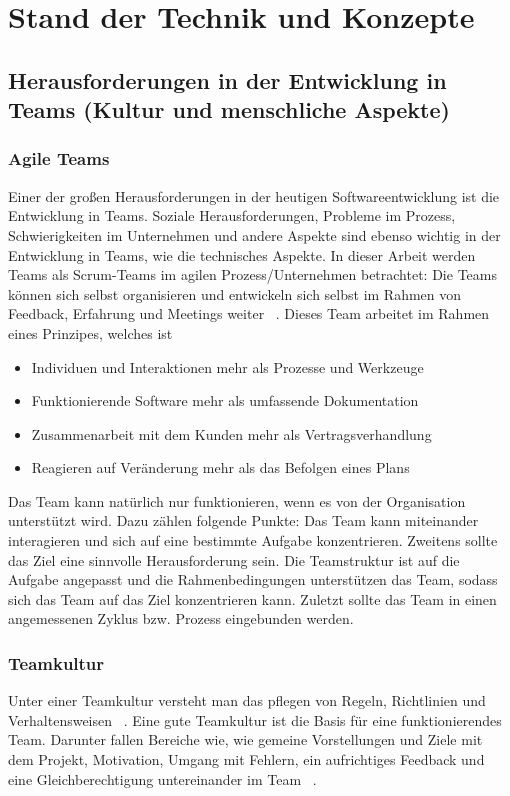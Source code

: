 \chapter{Stand der Technik und Konzepte}
\chapterstart

\label{chap:related}
\section{Herausforderungen in der Entwicklung in Teams (Kultur und menschliche Aspekte)}
\subsection{Agile Teams}
Einer der großen Herausforderungen in der heutigen Softwareentwicklung ist die Entwicklung in Teams. Soziale Herausforderungen, Probleme im Prozess, Schwierigkeiten im Unternehmen und andere Aspekte sind ebenso wichtig in der Entwicklung in Teams, wie die technisches Aspekte. In dieser Arbeit werden Teams als Scrum-Teams im agilen Prozess/Unternehmen betrachtet: Die Teams können sich selbst organisieren und entwickeln sich selbst im Rahmen von Feedback, Erfahrung und Meetings weiter ~\parencite{cohn2003introducing}. Dieses Team arbeitet im Rahmen eines Prinzipes, welches ist ~\parencite{beck2001agile}
\begin{itemize} 
\item Individuen und Interaktionen mehr als Prozesse und Werkzeuge
\item Funktionierende Software mehr als umfassende Dokumentation
\item Zusammenarbeit mit dem Kunden mehr als Vertragsverhandlung
\item Reagieren auf Veränderung mehr als das Befolgen eines Plans
\end{itemize}
Das Team kann natürlich nur funktionieren, wenn es von der Organisation unterstützt wird. Dazu zählen folgende Punkte: Das Team kann miteinander interagieren und sich auf eine bestimmte Aufgabe konzentrieren. Zweitens sollte das Ziel eine sinnvolle Herausforderung sein. Die Teamstruktur ist auf die Aufgabe angepasst und die Rahmenbedingungen unterstützen das Team, sodass sich das Team auf das Ziel konzentrieren kann. Zuletzt sollte das Team in einen angemessenen Zyklus bzw. Prozess eingebunden werden. ~\parencite{boos2017fuhrung}
\subsection{Teamkultur}
Unter einer Teamkultur versteht man das pflegen von Regeln, Richtlinien und Verhaltensweisen ~\parencite{teamculture}. Eine gute Teamkultur ist die Basis für eine funktionierendes Team. Darunter fallen Bereiche wie, wie gemeine Vorstellungen und Ziele mit dem Projekt, Motivation, Umgang mit Fehlern, ein aufrichtiges Feedback und eine Gleichberechtigung untereinander im Team ~\parencite{teamcultureGrolman}. 

